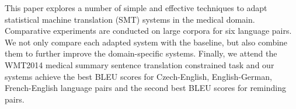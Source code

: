 This paper explores a number of simple and effective techniques to adapt statistical machine translation (SMT) systems in the medical domain. Comparative experiments are conducted on large corpora for six language pairs. We not only compare each adapted system with the baseline, but also combine them to further improve the domain-specific systems. Finally, we attend the WMT2014 medical summary sentence translation constrained task and our systems achieve the best BLEU scores for Czech-English, English-German, French-English language pairs and the second best BLEU scores for reminding pairs.
